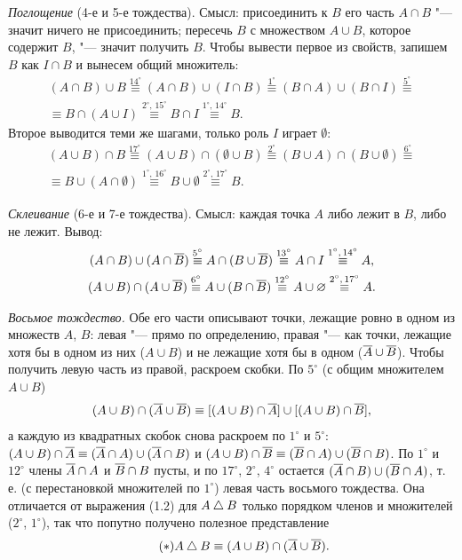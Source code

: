 \begin{solution}[1 (\S\,1)]
\emph{Поглощение} (4-е и 5-е тождества). Смысл: присоединить к $B$ его
часть $A\cap B$ "--- значит ничего не присоединить; пересечь $B$
с множеством $A\cup B$, которое содержит $B$, "--- значит получить $B$.
Чтобы вывести первое из свойств, запишем $B$ как $I\cap B$ и вынесем
общий множитель:
\begin{multline*}
(A\cap B)\cup B\overset{14^\circ}{\equiv}(A\cap B)\cup(I\cap B)
\overset{1^\circ}{\equiv}(B\cap A)\cup(B\cap I)\overset{5^\circ}{\equiv}{}\\
\equiv B\cap(A\cup I)\overset{2^\circ,\,15^\circ}{\equiv}B\cap I
\overset{1^\circ,\,14^\circ}{\equiv}B .
\end{multline*}
Второе выводится теми же шагами, только роль $I$ играет $\emptyset$:
\begin{multline*}
(A\cup B)\cap B\overset{17^\circ}{\equiv}(A\cup B)\cap(\emptyset\cup B)
\overset{2^\circ}{\equiv}(B\cup A)\cap(B\cup\emptyset)\overset{6^\circ}{\equiv}{}\\
\equiv B\cup(A\cap\emptyset)\overset{1^\circ,\,16^\circ}{\equiv}B\cup\emptyset
\overset{2^\circ,\,17^\circ}{\equiv}B .
\end{multline*}

\emph{Склеивание} (6-е и 7-е тождества). Смысл: каждая точка $A$ либо
лежит в $B$, либо не лежит. Вывод:
\begin{gather*}
(A\cap B)\cup(A\cap\overline{B})\overset{5^\circ}{\equiv}A\cap(B\cup\overline{B})
\overset{13^\circ}{\equiv}A\cap I\overset{1^\circ,\,14^\circ}{\equiv}A,\\
(A\cup B)\cap(A\cup\overline{B})\overset{6^\circ}{\equiv}A\cup(B\cap\overline{B})
\overset{12^\circ}{\equiv}A\cup\varnothing\overset{2^\circ,\,17^\circ}{\equiv}A.
\end{gather*}

\emph{Восьмое тождество.} Обе его части описывают точки, лежащие ровно
в одном из множеств $A$, $B$: левая "--- прямо по определению, правая "---
как точки, лежащие хотя бы в одном из них ($A\cup B$) и не лежащие хотя бы
в одном ($\overline{A}\cup\overline{B}$). Чтобы получить левую часть из правой, раскроем
скобки. По $5^\circ$ (с общим множителем $A\cup B$)
\[
(A\cup B)\cap(\overline{A}\cup\overline{B})\equiv[(A\cup B)\cap\overline{A}]\cup[(A\cup B)\cap\overline{B}],
\]
а каждую из квадратных скобок снова раскроем по $1^\circ$ и $5^\circ$:
$(A\cup B)\cap\overline{A}\equiv(\overline{A}\cap A)\cup(\overline{A}\cap B)$ и
$(A\cup B)\cap\overline{B}\equiv(\overline{B}\cap A)\cup(\overline{B}\cap B)$. По $1^\circ$
и $12^\circ$ члены $\overline{A}\cap A$ и $\overline{B}\cap B$ пусты, и по $17^\circ$,
$2^\circ$, $4^\circ$ остается $(\overline{A}\cap B)\cup(\overline{B}\cap A)$, т.\,е.
(с перестановкой множителей по $1^\circ$) левая часть восьмого тождества.
Она отличается от выражения (1.2) для $A\mathbin{\triangle} B$ только порядком членов
и множителей ($2^\circ$, $1^\circ$), так что попутно получено полезное
представление
\begin{equation*}\tag{$*$}
A\mathbin{\triangle} B\equiv(A\cup B)\cap(\overline{A}\cup\overline{B}).
\end{equation*}


\end{solution}

